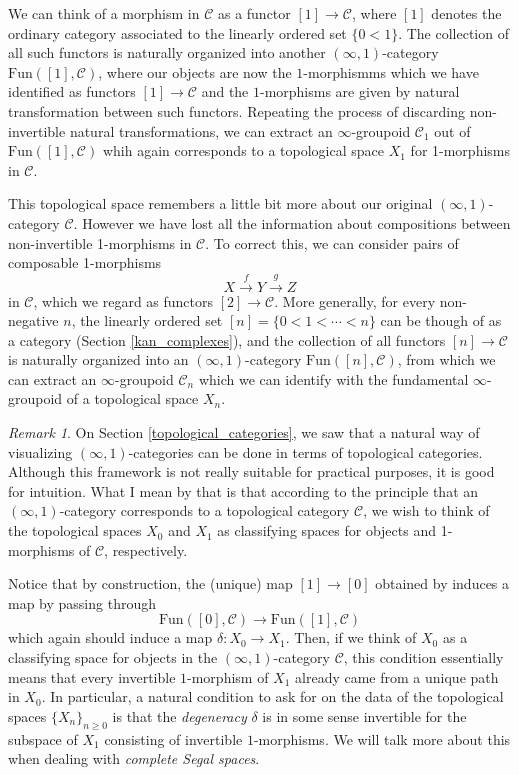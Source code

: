 \documentclass[a4paper,11pt]{article}
\newcommand{\ccal}{\mathcal{C}}
\theoremstyle{plain}
\theoremstyle{definition}
\theoremstyle{remark}
\newtheorem*{rem}{Remark}
\begin{document}
We can think of a morphism in $\ccal$ as a functor $[1] \to \ccal$, where $[1]$ denotes the ordinary category associated to the linearly ordered set $\{0<1\}$. The collection of all such functors is naturally organized into another $(\infty, 1)$-category $\text{Fun}([1], \ccal)$, where our objects are now the $1$-morphismms which we have identified as functors $[1] \to \ccal$ and the $1$-morphisms are given by natural transformation between such functors. Repeating the process of discarding non-invertible natural transformations, we can extract an $\infty$-groupoid $\ccal_1$ out of $\text{Fun}([1], \ccal)$ whih again corresponds to a topological space $X_1$ for 1-morphisms in $\ccal$. 

This topological space remembers a little bit more about our original $(\infty, 1)$-category $\ccal$. However we have lost all the information about compositions between non-invertible 1-morphisms in $\ccal$. To correct this, we can consider pairs of composable 1-morphisms 
$$X \xrightarrow{f} Y \xrightarrow{g} Z$$
in $\ccal$, which we regard as functors $[2] \to \ccal$. More generally, for every non-negative $n$, the linearly ordered set $[n] = \{0 < 1 < \cdots < n \}$ can be though of as a category (Section \ref{kan_complexes}), and the collection of all functors $[n] \to \ccal$ is naturally organized into an $(\infty, 1)$-category $\text{Fun}([n], \ccal)$, from which we can extract an $\infty$-groupoid $\ccal_n$ which we can identify with the fundamental $\infty$-groupoid of a topological space $X_n$. 


\begin{rem}
\label{teaser}
On Section \ref{topological_categories}, we saw that a natural way of visualizing $(\infty, 1)$-categories can be done in terms of topological categories. Although this framework is not really suitable for practical purposes, it is good for intuition. What I mean by that is that according to the principle that an $(\infty, 1)$-category corresponds to a topological category $\ccal$, we wish to think of the topological spaces $X_0$ and $X_1$ as classifying spaces for objects and 1-morphisms of $\ccal$, respectively. 

Notice that by construction, the (unique) map $[1] \to [0]$ obtained by  induces a map by passing through 
$$\text{Fun}([0], \ccal) \to \text{Fun}([1], \ccal)$$
which again should induce a map $\delta \colon X_0 \to X_1$. Then, if we think of $X_0$ as a classifying space for objects in the $(\infty, 1)$-category $\ccal$, this condition essentially means that every invertible $1$-morphism of $X_1$ already came from a unique path in $X_0$. In particular, a natural condition to ask for on the data of the topological spaces $\{X_n\}_{n \geq 0}$ is that the \textit{degeneracy} $\delta$ is in some sense invertible for the subspace of $X_1$ consisting of invertible $1$-morphisms. We will talk more about this when dealing with \textit{complete Segal spaces}.
\end{rem}
\end{document}
